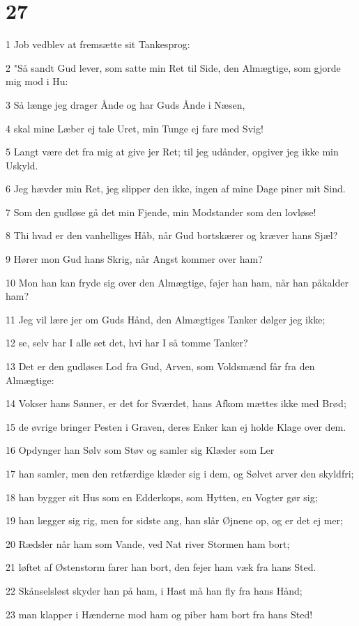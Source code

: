 \chapter{27}

\par 1 Job vedblev at fremsætte sit Tankesprog:
\par 2 "Så sandt Gud lever, som satte min Ret til Side, den Almægtige, som gjorde mig mod i Hu:
\par 3 Så længe jeg drager Ånde og har Guds Ånde i Næsen,
\par 4 skal mine Læber ej tale Uret, min Tunge ej fare med Svig!
\par 5 Langt være det fra mig at give jer Ret; til jeg udånder, opgiver jeg ikke min Uskyld.
\par 6 Jeg hævder min Ret, jeg slipper den ikke, ingen af mine Dage piner mit Sind.
\par 7 Som den gudløse gå det min Fjende, min Modstander som den lovløse!
\par 8 Thi hvad er den vanhelliges Håb, når Gud bortskærer og kræver hans Sjæl?
\par 9 Hører mon Gud hans Skrig, når Angst kommer over ham?
\par 10 Mon han kan fryde sig over den Almægtige, føjer han ham, når han påkalder ham?
\par 11 Jeg vil lære jer om Guds Hånd, den Almægtiges Tanker dølger jeg ikke;
\par 12 se, selv har I alle set det, hvi har I så tomme Tanker?
\par 13 Det er den gudløses Lod fra Gud, Arven, som Voldsmænd får fra den Almægtige:
\par 14 Vokser hans Sønner, er det for Sværdet, hans Afkom mættes ikke med Brød;
\par 15 de øvrige bringer Pesten i Graven, deres Enker kan ej holde Klage over dem.
\par 16 Opdynger han Sølv som Støv og samler sig Klæder som Ler
\par 17 han samler, men den retfærdige klæder sig i dem, og Sølvet arver den skyldfri;
\par 18 han bygger sit Hus som en Edderkops, som Hytten, en Vogter gør sig;
\par 19 han lægger sig rig, men for sidste ang, han slår Øjnene op, og er det ej mer;
\par 20 Rædsler når ham som Vande, ved Nat river Stormen ham bort;
\par 21 løftet af Østenstorm farer han bort, den fejer ham væk fra hans Sted.
\par 22 Skånselsløst skyder han på ham, i Hast må han fly fra hans Hånd;
\par 23 man klapper i Hænderne mod ham og piber ham bort fra hans Sted!

